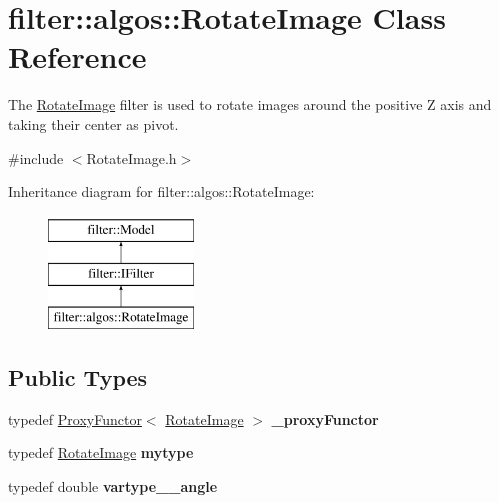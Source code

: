 \hypertarget{classfilter_1_1algos_1_1_rotate_image}{}\section{filter\+:\+:algos\+:\+:Rotate\+Image Class Reference}
\label{classfilter_1_1algos_1_1_rotate_image}


The \hyperlink{classfilter_1_1algos_1_1_rotate_image}{Rotate\+Image} filter is used to rotate images around the positive Z axis and taking their center as pivot.  




{\ttfamily \#include $<$Rotate\+Image.\+h$>$}

Inheritance diagram for filter\+:\+:algos\+:\+:Rotate\+Image\+:\begin{figure}[H]
\begin{center}
\leavevmode
\includegraphics[height=3.000000cm]{d5/d2d/classfilter_1_1algos_1_1_rotate_image}
\end{center}
\end{figure}
\subsection*{Public Types}
\begin{DoxyCompactItemize}
\item 
\mbox{\label{classfilter_1_1algos_1_1_rotate_image_aa79cc9fe2ba2fc5e04a9a592399a9ef3}} 
typedef \hyperlink{class_proxy_functor}{Proxy\+Functor}$<$ \hyperlink{classfilter_1_1algos_1_1_rotate_image}{Rotate\+Image} $>$ {\bfseries \+\_\+proxy\+Functor}
\item 
\mbox{\label{classfilter_1_1algos_1_1_rotate_image_a07d8447abdaf852a93dc44da55539637}} 
typedef \hyperlink{classfilter_1_1algos_1_1_rotate_image}{Rotate\+Image} {\bfseries mytype}
\item 
\mbox{\label{classfilter_1_1algos_1_1_rotate_image_a36581024e18a97634bd1bd1f8243f6eb}} 
typedef double {\bfseries vartype\+\_\+\+\_\+angle}
\end{DoxyCompactItemize}
